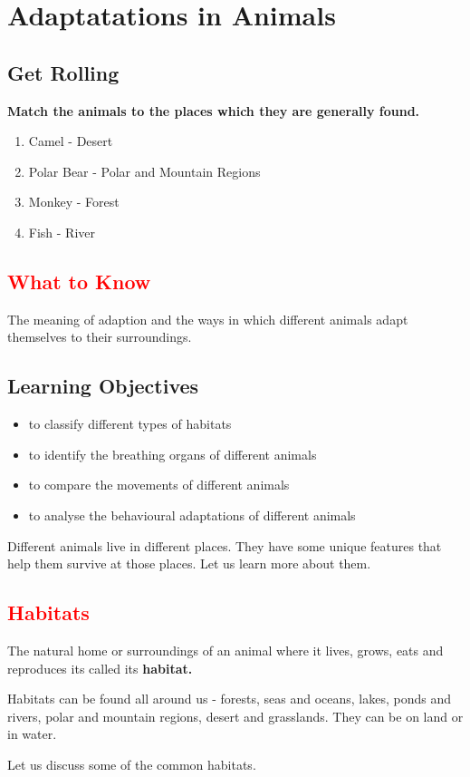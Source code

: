 \chapter{Adaptatations in Animals}
\section{\textbf{Get Rolling}}
\textbf{Match the animals to the places which they are generally found.}\
\begin{enumerate}
    \item Camel - Desert
    \item Polar Bear - Polar and Mountain Regions
    \item Monkey - Forest
    \item Fish - River
\end{enumerate}
\section{\textcolor{red}{What to Know}}
The meaning of adaption and the ways in which different animals adapt themselves to their surroundings.
\section{\textbf{Learning Objectives}}
\begin{itemize}
    \item to classify different types of habitats
    \item to identify the breathing organs of different animals
    \item to compare the movements of different animals
    \item to analyse the behavioural adaptations of different animals
\end{itemize}
Different animals live in different places. They have some unique features that help them survive at those places. Let us learn more about them.
\section{\textcolor{red}{Habitats}}
The natural home or surroundings of an animal where it lives, grows, eats and reproduces its called its \textbf{habitat.}\\
\par
Habitats can be found all around us - forests, seas and oceans, lakes, ponds and rivers, polar and mountain regions, desert and grasslands. They can be on land or in water.\\
\par
Let us discuss some of the common habitats.
